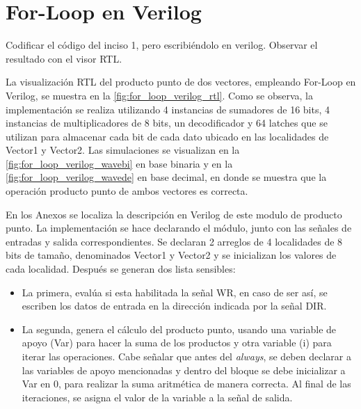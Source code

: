 \section{For-Loop en Verilog \label{sec:s3}}

\begin{center}
	\begin{minipage}{12cm}
		\begin{tcolorbox}[title=Actividad 1]
			Codificar el código del inciso 1, pero escribiéndolo en verilog. Observar el resultado con el visor RTL.
		\end{tcolorbox}	
	\end{minipage}
\end{center}

La visualización RTL del producto punto de dos vectores, empleando For-Loop en Verilog, se muestra en la \autoref{fig:for_loop_verilog_rtl}. Como se observa, la implementación se realiza utilizando 4 instancias de sumadores de 16 bits, 4 instancias de multiplicadores de 8 bits, un decodificador y 64 latches que se utilizan para almacenar cada bit de cada dato ubicado en las localidades de Vector1 y Vector2. Las simulaciones se visualizan en la \autoref{fig:for_loop_verilog_wavebi} en base binaria y en la \autoref{fig:for_loop_verilog_wavede} en base decimal, en donde se muestra que la operación producto punto de ambos vectores es correcta.

En los Anexos se localiza la descripción en Verilog de este modulo de producto punto. La implementación se hace declarando el módulo, junto con las señales de entradas y salida correspondientes. Se declaran 2 arreglos de 4 localidades de 8 bits de tamaño, denominados Vector1 y Vector2 y se inicializan los valores de cada localidad. Después se generan dos lista sensibles:

\begin{itemize}
	\item La primera, evalúa si esta habilitada la señal WR, en caso de ser así, se escriben los datos de entrada en la dirección indicada por la señal DIR.
	\item La segunda, genera el cálculo del producto punto, usando una variable de apoyo (Var) para hacer la suma de los productos y otra variable (i) para iterar las operaciones. Cabe señalar que antes del \textit{always}, se deben declarar a las variables de apoyo mencionadas y dentro del bloque se debe inicializar a Var en 0, para realizar la suma aritmética de manera correcta. Al final de las iteraciones, se asigna el valor de la variable a la señal de salida.
\end{itemize}

